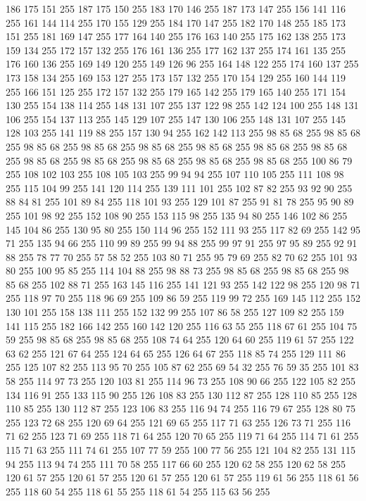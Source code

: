 186 175 151 255 187 175 150 255 183 170 146 255 187 173 147 255 156 141 116 255 161 144 114 255 170 155 129 255 184 170 147 255 182 170 148 255 185 173 151 255 181 169 147 255 177 164 140 255 176 163 140 255 175 162 138 255 173 159 134 255 172 157 132 255 176 161 136 255 177 162 137 255 174 161 135 255 176 160 136 255 169 149 120 255 149 126 96 255 164 148 122 255 174 160 137 255 173 158 134 255 169 153 127 255 173 157 132 255 170 154 129 255 160 144 119 255 166 151 125 255 172 157 132 255 179 165 142 255 179 165 140 255 171 154 130 255 154 138 114 255 148 131 107 255 137 122 98 255 142 124 100 255 148 131 106 255 154 137 113 255 145 129 107 255 147 130 106 255 148 131 107 255 145 128 103 255 141 119 88 255 157 130 94 255 162 142 113 255 98 85 68 255 98 85 68 255 98 85 68 255 98 85 68 255 98 85 68 255 98 85 68 255 98 85 68 255 98 85 68 255 98 85 68 255 98 85 68 255 98 85 68 255 98 85 68 255 98 85 68 255 100 86 79 255 108 102 103 255 108 105 103 255 99 94 94 255
107 110 105 255 111 108 98 255 115 104 99 255 141 120 114 255 139 111 101 255 102 87 82 255 93 92 90 255 88 84 81 255 101 89 84 255 118 101 93 255 129 101 87 255 91 81 78 255 95 90 89 255 101 98 92 255 152 108 90 255 153 115 98 255 135 94 80 255 146 102 86 255 145 104 86 255 130 95 80 255 150 114 96 255 152 111 93 255 117 82 69 255 142 95 71 255 135 94 66 255 110 99 89 255 99 94 88 255 99 97 91 255 97 95 89 255 92 91 88 255 78 77 70 255 57 58 52 255 103 80 71 255 95 79 69 255 82 70 62 255 101 93 80 255 100 95 85 255 114 104 88 255 98 88 73 255 98 85 68 255 98 85 68 255 98 85 68 255 102 88 71 255 163 145 116 255 141 121 93 255 142 122 98 255 120 98 71 255 118 97 70 255 118 96 69 255 109 86 59 255 119 99 72 255 169 145 112 255 152 130 101 255 158 138 111 255 152 132 99 255 107 86 58 255 127 109 82 255 159 141 115 255 182 166 142 255 160 142 120 255 116 63 55 255 118 67 61 255 104 75 59 255 98 85 68 255
98 85 68 255 108 74 64 255 120 64 60 255 119 61 57 255 122 63 62 255 121 67 64 255 124 64 65 255 126 64 67 255 118 85 74 255 129 111 86 255 125 107 82 255 113 95 70 255 105 87 62 255 69 54 32 255 76 59 35 255 101 83 58 255 114 97 73 255 120 103 81 255 114 96 73 255 108 90 66 255 122 105 82 255 134 116 91 255 133 115 90 255 126 108 83 255 130 112 87 255 128 110 85 255 128 110 85 255 130 112 87 255 123 106 83 255 116 94 74 255 116 79 67 255 128 80 75 255 123 72 68 255 120 69 64 255 121 69 65 255 117 71 63 255 126 73 71 255 116 71 62 255 123 71 69 255 118 71 64 255 120 70 65 255 119 71 64 255 114 71 61 255 115 71 63 255 111 74 61 255 107 77 59 255 100 77 56 255 121 104 82 255 131 115 94 255 113 94 74 255 111 70 58 255 117 66 60 255 120 62 58 255 120 62 58 255 120 61 57 255 120 61 57 255 120 61 57 255 120 61 57 255 119 61 56 255 118 61 56 255 118 60 54 255 118 61 55 255 118 61 54 255 115 63 56 255
